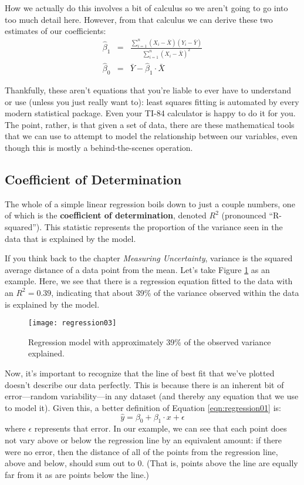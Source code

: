 How we actually do this involves a bit of calculus so we aren't going to go into too much detail here. However, from that calculus we can derive these two estimates of our coefficients:
\begin{eqnarray*}
\hat{\beta}_1 &=& \frac{\sum_{i=1}^n\left(X_i-\bar{X}\right)\left(Y_i-\bar{Y}\right)}{\sum_{i=1}^n\left(X_i-\bar{X}\right)^2}\\
\hat{\beta}_0 &=& \bar{Y}-\hat{\beta}_1\cdot \bar{X}
\end{eqnarray*}

Thankfully, these aren't equations that you're liable to ever have to understand or use (unless you just really want to): least squares fitting is automated by every modern statistical package. Even your TI-84 calculator is happy to do it for you. The point, rather, is that given a set of data, there are these mathematical tools that we can use to attempt to model the relationship between our variables, even though this is mostly a behind-the-scenes operation.

\subsection{Coefficient of Determination}

The whole of a simple linear regression boils down to just a couple numbers, one of which is the \textbf{coefficient of determination}, denoted $R^2$ (pronounced ``R-squared''). This statistic represents the proportion of the variance seen in the data that is explained by the model.

If you think back to the chapter \textit{Measuring Uncertainty}, variance is the squared average distance of a data point from the mean. Let's take Figure \ref{fig:regression03} as an example. Here, we see that there is a regression equation fitted to the data with an $R^2=0.39$, indicating that about 39\% of the variance observed within the data is explained by the model.

\begin{figure}[htp]
\texttt{[image: regression03]}
\caption{Regression model with approximately 39\% of the observed variance explained.}
\label{fig:regression03}
\end{figure}

Now, it's important to recognize that the line of best fit that we've plotted doesn't describe our data perfectly. This is because there is an inherent bit of error---random variability---in any dataset (and thereby any equation that we use to model it). Given this, a better definition of Equation \ref{eqn:regression01} is:
\begin{equation}
\hat{y} = \beta_0 + \beta_1\cdot x+\epsilon
\label{eqn:regression02}
\end{equation}
where $\epsilon$ represents that error. In our example, we can see that each point does not vary above or below the regression line by an equivalent amount: if there were no error, then the distance of all of the points from the regression line, above and below, should sum out to 0. (That is, points above the line are equally far from it as are points below the line.)

